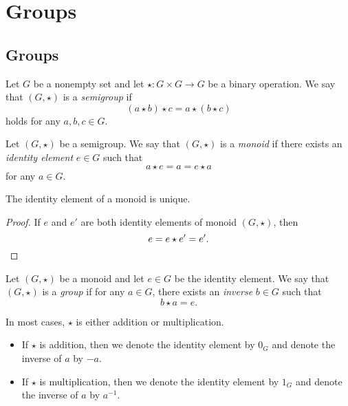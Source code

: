 \chapter{Groups}
\section{Groups}
\begin{definition}
  Let $G$ be a nonempty set and let $\star: G \times G \to G$ be a binary
  operation.
  We say that $(G, \star)$ is a \emph{semigroup} if
  \begin{equation*}
    (a \star b) \star c = a \star (b \star c)
  \end{equation*}
  holds for any $a, b, c \in G$.
\end{definition}

\begin{definition}
  Let $(G, \star)$ be a semigroup.
  We say that $(G, \star)$ is a \emph{monoid} if there exists an \emph{identity
  element} $e \in G$ such that
  \begin{equation*}
    a \star e = a = e \star a
  \end{equation*}
  for any $a \in G$.
\end{definition}

\begin{theorem}
  The identity element of a monoid is unique.
\end{theorem}
\begin{proof}
  If $e$ and $e'$ are both identity elements of monoid $(G, \star)$, then
  \begin{equation*}
    e = e \star e' = e'.
    \qedhere
  \end{equation*}
\end{proof}

\begin{definition}
  Let $(G, \star)$ be a monoid and let $e \in G$ be the identity element.
  We say that $(G, \star)$ is a \emph{group} if for any $a \in G$, there exists
  an \emph{inverse} $b \in G$ such that
  \begin{equation*}
    b \star a = e.
  \end{equation*}
\end{definition}
\begin{remark}
  In most cases, $\star$ is either addition or multiplication.
  \begin{itemize}
    \item If $\star$ is addition, then we denote the identity element by $0_G$
    and denote the inverse of $a$ by $-a$.
    \item If $\star$ is multiplication, then we denote the identity element by
    $1_G$ and denote the inverse of $a$ by $a^{-1}$.
  \end{itemize}
\end{remark}

